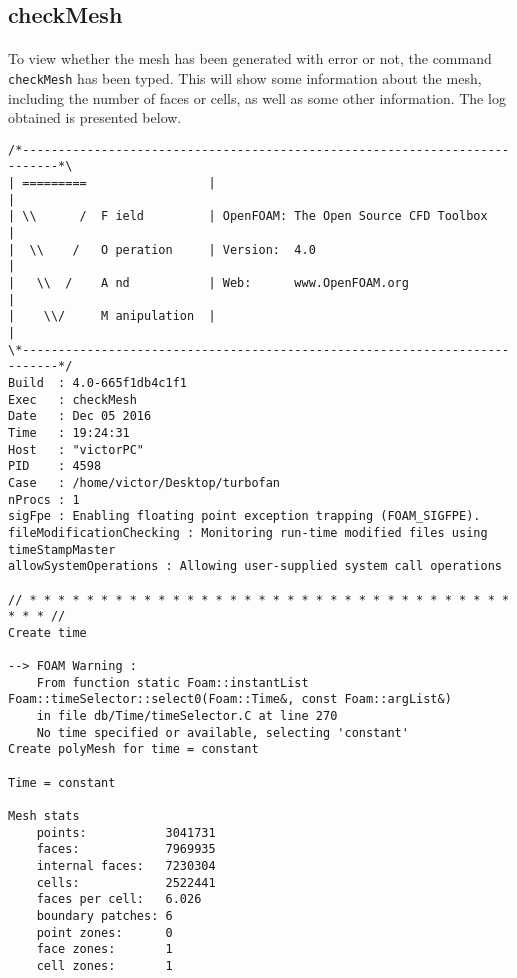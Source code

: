 \subsection{checkMesh}

\paragraph{}To view whether the mesh has been generated with error or not, the command \texttt{checkMesh} has been typed. This will show some information about the mesh, including the number of faces or cells, as well as some other information. The log obtained is presented below.

\begin{footnotesize}
\begin{verbatim}
/*---------------------------------------------------------------------------*\
| =========                 |                                                 |
| \\      /  F ield         | OpenFOAM: The Open Source CFD Toolbox           |
|  \\    /   O peration     | Version:  4.0                                   |
|   \\  /    A nd           | Web:      www.OpenFOAM.org                      |
|    \\/     M anipulation  |                                                 |
\*---------------------------------------------------------------------------*/
Build  : 4.0-665f1db4c1f1
Exec   : checkMesh
Date   : Dec 05 2016
Time   : 19:24:31
Host   : "victorPC"
PID    : 4598
Case   : /home/victor/Desktop/turbofan
nProcs : 1
sigFpe : Enabling floating point exception trapping (FOAM_SIGFPE).
fileModificationChecking : Monitoring run-time modified files using timeStampMaster
allowSystemOperations : Allowing user-supplied system call operations

// * * * * * * * * * * * * * * * * * * * * * * * * * * * * * * * * * * * * * //
Create time

--> FOAM Warning : 
    From function static Foam::instantList Foam::timeSelector::select0(Foam::Time&, const Foam::argList&)
    in file db/Time/timeSelector.C at line 270
    No time specified or available, selecting 'constant'
Create polyMesh for time = constant

Time = constant

Mesh stats
    points:           3041731
    faces:            7969935
    internal faces:   7230304
    cells:            2522441
    faces per cell:   6.026
    boundary patches: 6
    point zones:      0
    face zones:       1
    cell zones:       1


\end{verbatim}
\end{footnotesize}
